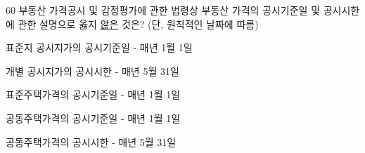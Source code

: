 \begin{question}{60}
부동산 가격공시 및 감정평가에 관한 법령상 부동산 가격의 공시기준일 및 공시시한에 관한 설명으로 옳지 \uline{않은} 것은? (단, 원칙적인 날짜에 따름)
\begin{choices}
  \item 표준지 공시지가의 공시기준일 - 매년 1월 1일
  \item 개별 공시지가의 공시시한 - 매년 5월 31일
  \item 표준주택가격의 공시기준일 - 매년 1월 1일
  \item 공동주택가격의 공시기준일 - 매년 1월 1일
  \item 공동주택가격의 공시시한 - 매년 5월 31일
\end{choices}
\end{question}
